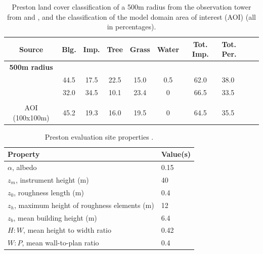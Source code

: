 \documentclass[final,3p,times,authoryear]{elsarticle}
\begin{document}
\begin{table}[!htbp]
\caption
{Preston land cover classification of a 500m radius from the observation tower from \cite{Coutts2007} and \cite{Nury2015}, and the classification of the model domain area of interest (AOI) (all in percentages). \label{tab:expertValues}} 
\begin{tabular}{ |c |c| c | c |c |c |c|p{1.65cm}|p{1.65cm}| } 
\hline \textbf{Source} & \textbf{Blg.}&	\textbf{Imp.}&\textbf{Tree}&\textbf{Grass}	&\textbf{Water}&\textbf{Tot. Imp.}&\textbf{Tot. Per.} \\ \hline
\textbf{500m radius} & & & & & &	&  \\ \hline 
\cite{Coutts2007} &44.5 &17.5&22.5 &15.0 &0.5 &62.0 &38.0	  \\ \hline 
\cite{Nury2015} &32.0 &34.5 &10.1 &23.4 &0 &66.5 &33.5  \\ \hline 
 & & & & & &	&  \\ \hline 
AOI (100x100m) &45.2 &19.3 &16.0 &19.5 &0 &64.5	&35.5  \\ \hline 
\end{tabular} 
\end{table}  
 
\begin{table}[!htbp]
\caption{Preston evaluation site properties \citep{Coutts2007}. \label{tab:prvalpara}}     
\begin{tabular}{| l | l |}
\hline
\textbf{Property} & \textbf{Value(s)} \\ \hline
$\alpha$, albedo & 0.15  \\ \hline
$z_{m}$, instrument height (m)&  40  \\ \hline
$z_{0}$, roughness length (m)& 0.4  \\ \hline
$z_{h}$, maximum height of roughness elements (m)& 12  \\ \hline
$z_{b}$, mean building height (m)& 6.4  \\ \hline
$H:W$, mean height to width ratio& 0.42  \\ \hline
$W:P$, mean wall-to-plan ratio &0.4  \\ \hline
\end{tabular}
\end{table}
\end{document}
